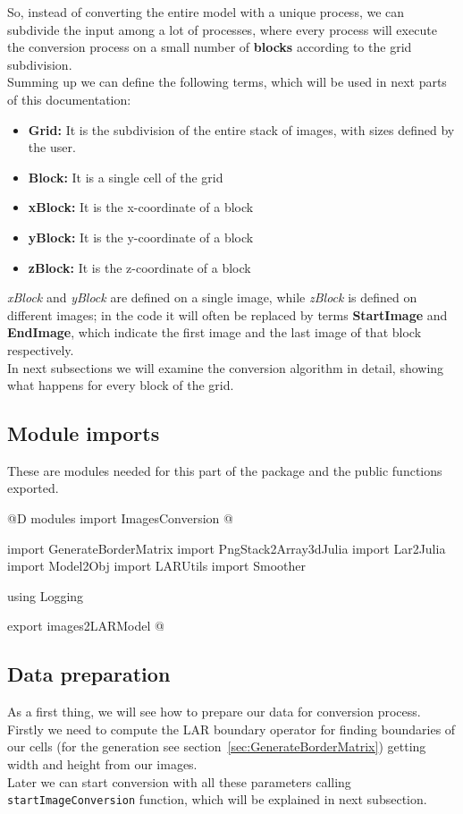 \documentclass[11pt,oneside]{article}	%
\begin{document}
So, instead of converting the entire model with a unique process, we can subdivide the input among a lot of processes, where every process will execute the conversion process on a small number of \textbf{blocks} according to the grid subdivision.\\

Summing up we can define the following terms, which will be used in next parts of this documentation:

\begin{itemize}
 \item \textbf{Grid:} It is the subdivision of the entire stack of images, with sizes defined by the user.
 \item \textbf{Block:} It is a single cell of the grid
 \item \textbf{xBlock:} It is the x-coordinate of a block
 \item \textbf{yBlock:} It is the y-coordinate of a block
 \item \textbf{zBlock:} It is the z-coordinate of a block
\end{itemize}

\textit{xBlock} and \textit{yBlock} are defined on a single image, while \textit{zBlock} is defined on different images; in the code it will often be replaced by terms \textbf{StartImage} and \textbf{EndImage}, which indicate the first image and the last image of that block respectively.\\

In next subsections we will examine the conversion algorithm in detail, showing what happens for every block of the grid.

\subsection{Module imports}\label{sec:ImagesConversionImports}
These are modules needed for this part of the package and the public functions exported.

@D modules import ImagesConversion
@{import GenerateBorderMatrix
import PngStack2Array3dJulia
import Lar2Julia
import Model2Obj
import LARUtils
import Smoother

using Logging

export images2LARModel
@}

\subsection{Data preparation}\label{sec:ImagesConversionDataPreparation}
As a first thing, we will see how to prepare our data for conversion process. Firstly we need to compute the LAR boundary operator for finding boundaries of our cells (for the generation see section~\ref{sec:GenerateBorderMatrix}) getting width and height from our images.\\
Later we can start conversion with all these parameters calling \texttt{startImageConversion} function, which will be explained in next subsection.
\end{document}
